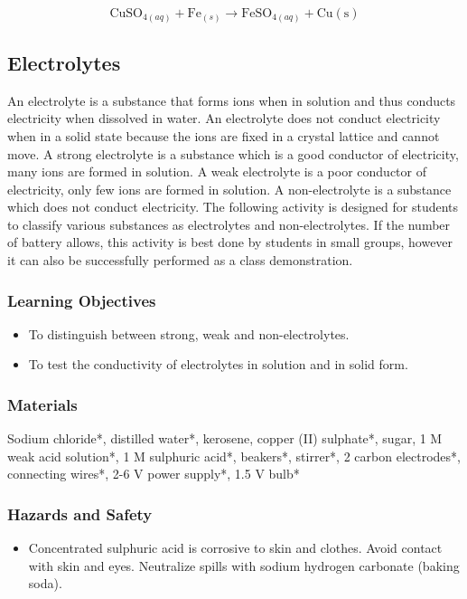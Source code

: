 $$ \mathrm{CuSO}_{4(aq)} + \mathrm{Fe}_{(s)} \longrightarrow \mathrm{FeSO}_{4(aq)} + \mathrm{Cu(s)} $$

\subsection{Electrolytes}

An electrolyte is a substance that forms ions when in solution and thus conducts electricity when dissolved in water. An electrolyte does not conduct electricity when in a solid state because the ions are fixed in a crystal lattice and cannot move.  A strong electrolyte is a substance which is a good conductor of electricity, many ions are formed in solution. A weak electrolyte is a poor conductor of electricity, only few ions are formed in solution. A non-electrolyte is a substance which does not conduct electricity. The following activity is designed for students to classify various substances as electrolytes and non-electrolytes. If the number of battery allows, this activity is best done by students in small groups, however it can also be successfully performed as a class demonstration.

\subsubsection*{Learning Objectives}
\begin{itemize}
\item{To distinguish between strong, weak and non-electrolytes.}
\item{To test the conductivity of electrolytes in solution and in solid form.}
\end{itemize}

\subsubsection*{Materials}
Sodium chloride*, distilled water*, kerosene, copper (II) sulphate*, sugar, 1 M weak acid solution*, 1 M sulphuric acid*, beakers*, stirrer*, 2 carbon electrodes*, connecting wires*, 2-6 V power supply*, 1.5 V bulb*

\subsubsection*{Hazards and Safety}
\begin{itemize}
\item{Concentrated sulphuric acid is corrosive to skin and clothes. Avoid contact with skin and eyes. Neutralize spills with sodium hydrogen carbonate (baking soda).}
\end{itemize}

